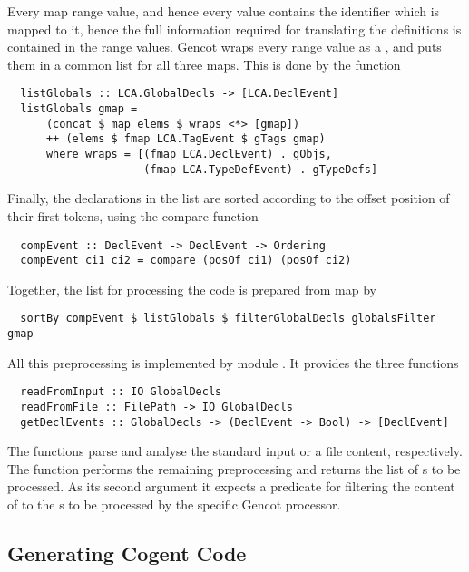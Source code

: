 Every map range value, and hence every  value contains the identifier which is mapped to it, 
hence the full information required for translating the definitions is contained in the range values. 
Gencot wraps every range value as a , and puts them in a common list for all three maps. This
is done by the function
\begin{verbatim}
  listGlobals :: LCA.GlobalDecls -> [LCA.DeclEvent]
  listGlobals gmap = 
      (concat $ map elems $ wraps <*> [gmap])
      ++ (elems $ fmap LCA.TagEvent $ gTags gmap)
      where wraps = [(fmap LCA.DeclEvent) . gObjs, 
                     (fmap LCA.TypeDefEvent) . gTypeDefs]
\end{verbatim}

Finally, the declarations in the list are sorted according to the offset position of their first tokens, using the
compare function
\begin{verbatim}
  compEvent :: DeclEvent -> DeclEvent -> Ordering
  compEvent ci1 ci2 = compare (posOf ci1) (posOf ci2)
\end{verbatim}

Together, the list for processing the code is prepared from map  by
\begin{verbatim}
  sortBy compEvent $ listGlobals $ filterGlobalDecls globalsFilter gmap
\end{verbatim}

All this preprocessing is implemented by module . It provides the three functions
\begin{verbatim}
  readFromInput :: IO GlobalDecls
  readFromFile :: FilePath -> IO GlobalDecls
  getDeclEvents :: GlobalDecls -> (DeclEvent -> Bool) -> [DeclEvent]
\end{verbatim}
The  functions parse and analyse the standard input or a file content, respectively. The function
 performs the remaining preprocessing and returns the list of s to be processed.
As its second argument it expects a predicate for filtering the content of  to the
s to be processed by the specific Gencot processor.

\subsection{Generating Cogent Code}
\label{impl-ccode-gencog}

